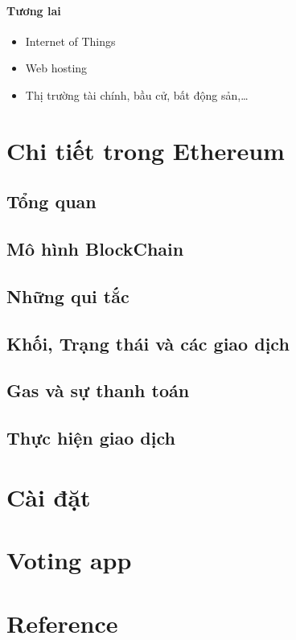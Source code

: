 \documentclass[12pt]{article}
\begin{document}
		\paragraph{Tương lai}
		\begin{itemize}
			\item Internet of Things
			
			\item Web hosting
			
			\item Thị trường tài chính, bầu cử, bất động sản,…
			
			
		\end{itemize}
	\newpage
	
	\section{Chi tiết trong Ethereum}
	
	\subsection{Tổng quan}
	
	\subsection{Mô hình BlockChain}
	
	\subsection{Những qui tắc}
	
	\subsection{Khối, Trạng thái và các giao dịch}
	
	\subsection{Gas và sự thanh toán}
	
	\subsection{Thực hiện giao dịch}
	
	\section{Cài đặt}
	
	
	\section{Voting app}
	
	\section{Reference}
	
\end{document}

